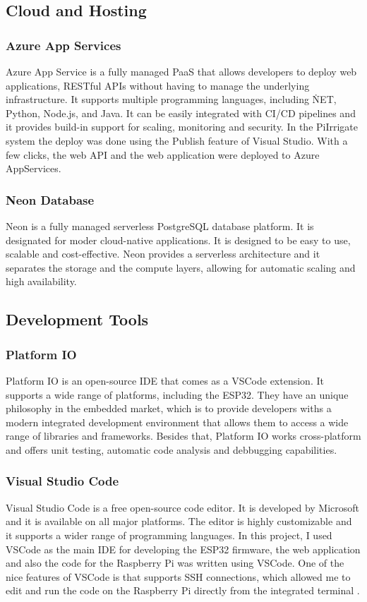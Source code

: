 \subsection{Cloud and Hosting}
\subsubsection{Azure App Services}
Azure App Service is a fully managed PaaS that allows developers to deploy web applications, RESTful APIs without having to manage the
underlying infrastructure. It supports multiple programming languages, including \.NET, Python, Node.js, and Java. It can be
easily integrated with CI/CD pipelines and it provides build-in support for scaling, monitoring and security\cite{azure_app_service}.
In the PiIrrigate system the deploy was done using the Publish feature of Visual Studio. With a few clicks, the web API and the web application
were deployed to Azure AppServices.

\subsubsection{Neon Database}
Neon is a fully managed serverless PostgreSQL database platform. It is designated for moder cloud-native applications. It is 
designed to be easy to use, scalable and cost-effective. Neon provides a serverless architecture and it separates the storage and the compute layers,
allowing for automatic scaling and high availability.

\subsection{Development Tools}
\subsubsection{Platform IO}
Platform IO is an open-source IDE that comes as a VSCode extension. It supports a wide range of platforms, including the ESP32.
They have an unique philosophy in the embedded market, which is to provide developers withs a modern integrated development environment that
allows them to access a wide range of libraries and frameworks. Besides that, Platform IO works cross-platform and offers unit testing, automatic code
analysis and debbugging capabilities\cite{python_org}\cite{python}\cite{peps}.

\subsubsection{Visual Studio Code}
Visual Studio Code is a free open-source code editor. It is developed by Microsoft and it is available on all major platforms.
The editor is highly customizable and it supports a wider range of programming languages. In this project, I used VSCode 
as the main IDE for developing the ESP32 firmware, the web application and also the code for the Raspberry Pi was written using VSCode. One of the nice
features of VSCode is that supports SSH connections, which allowed me to edit and run the code on the Raspberry Pi directly from the integrated terminal
\cite{visualstudio_docs}.

